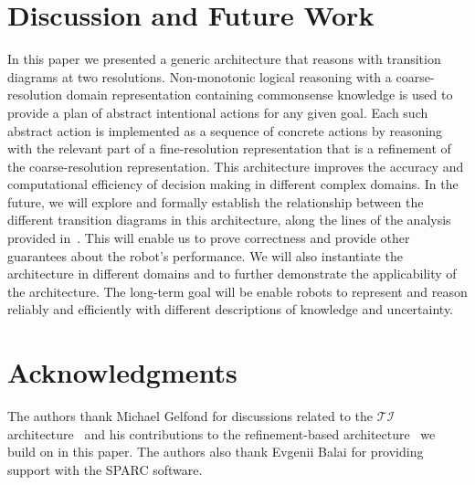 \documentclass[letterpaper, 10 pt, conference]{ieeeconf}  %
\begin{document}
\section{Discussion and Future Work}
In this paper we presented a generic architecture that reasons with
transition diagrams at two resolutions. Non-monotonic logical
reasoning with a coarse-resolution domain representation containing
commonsense knowledge is used to provide a plan of abstract
intentional actions for any given goal.  Each such abstract action is
implemented as a sequence of concrete actions by reasoning with the
relevant part of a fine-resolution representation that is a refinement
of the coarse-resolution representation. This architecture improves
the accuracy and computational efficiency of decision making in
different complex domains. In the future, we will explore and formally
establish the relationship between the different transition diagrams
in this architecture, along the lines of the analysis provided
in~\cite{sridharan2017refinement}. This will enable us to prove
correctness and provide other guarantees about the robot's
performance. We will also instantiate the architecture in different
domains and to further demonstrate the applicability of the
architecture. The long-term goal will be enable robots to represent
and reason reliably and efficiently with different descriptions of
knowledge and uncertainty.

\section*{Acknowledgments}
The authors thank Michael Gelfond for discussions related to the
$\mathcal{TI}$ architecture~\cite{blount2015theory} and his
contributions to the refinement-based
architecture~\cite{sridharan2017refinement} we build on in this paper.
The authors also thank Evgenii Balai for providing support with the
SPARC software.



 


\end{document}
